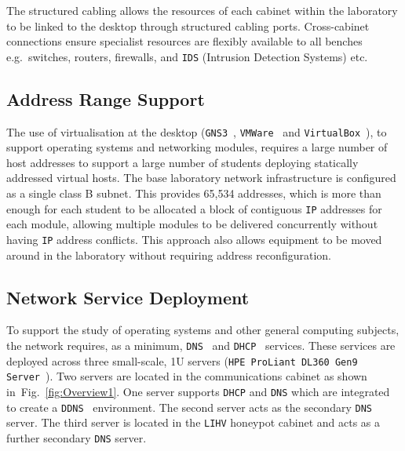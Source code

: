 \documentclass{ieeeaccess}
\begin{document}

The structured cabling allows the resources of each cabinet within the
laboratory to be linked to the desktop through structured cabling ports.
Cross-cabinet connections ensure specialist resources are flexibly available to
all benches e.g.\ switches, routers, firewalls, and \texttt{IDS} (Intrusion
Detection Systems) etc.

\subsection{Address Range Support}

The use of virtualisation at the desktop (\texttt{GNS3}~\cite{GNS3:17},
\texttt{VMWare}~\cite{VMWARE:17} and \texttt{VirtualBox}~\cite{O:17}), to
support operating systems and networking modules, requires a large number of
host addresses to support a large number of students deploying statically
addressed virtual hosts. The base laboratory network infrastructure is
configured as a single class B subnet.  This provides 65,534 addresses, which
is more than enough for each student to be allocated a block of contiguous
\texttt{IP} addresses for each module, allowing multiple modules to be
delivered concurrently without having \texttt{IP} address conflicts.  This
approach also allows equipment to be moved around in the laboratory without
requiring address reconfiguration.

\subsection{Network Service Deployment}\label{InfraService}

To support the study of operating systems and other general computing subjects,
the network requires, as a minimum, \texttt{DNS}~\cite{RA:11} and
\texttt{DHCP}~\cite{DL:02} services. These services are deployed across three
small-scale, 1U servers (\texttt{HPE ProLiant DL360 Gen9 Server}~\cite{HPE:17}). Two
servers are located in the communications cabinet as shown
in~Fig.~\ref{fig:Overview1}. One server supports \texttt{DHCP} and \texttt{DNS}
which are integrated to create a \texttt{DDNS}~\cite{SV:06} environment. The
second server acts as the secondary \texttt{DNS} server. The third server is
located in the \texttt{LIHV} honeypot cabinet and acts as a further secondary
\texttt{DNS} server.
\end{document}
